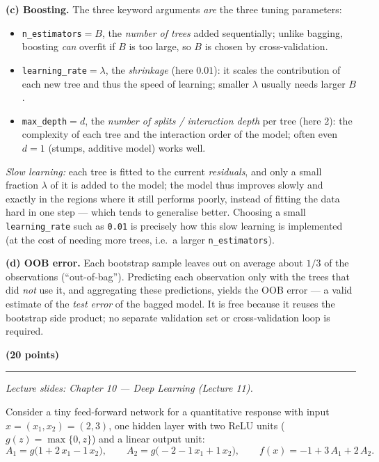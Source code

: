 \documentclass[11pt,a4paper]{article}
\newcommand{\problem}[2]{\par\vspace{7mm}\noindent{\large\textbf{Problem #1}}%
  \hfill{\large\textbf{(#2 points)}}\par\nopagebreak\vspace{0.6mm}%
  \noindent\rule{\textwidth}{0.6pt}\par\nopagebreak\vspace{2.5mm}}
\begin{document}
\begin{solutionbox}
\medskip
\textbf{(c) Boosting.}
The three keyword arguments \emph{are} the three tuning parameters:
\begin{itemize}[nosep,leftmargin=5mm]
  \item \texttt{n\_estimators}${}=B$, the \emph{number of trees} added sequentially; unlike
    bagging, boosting \emph{can} overfit if $B$ is too large, so $B$ is chosen by
    cross-validation.
  \item \texttt{learning\_rate}${}=\lambda$, the \emph{shrinkage} (here $0.01$): it scales the
    contribution of each new tree and thus the speed of learning; smaller $\lambda$ usually
    needs larger $B$.
  \item \texttt{max\_depth}${}=d$, the \emph{number of splits / interaction depth} per tree
    (here $2$): the complexity of each tree and the interaction order of the model; often even
    $d=1$ (stumps, additive model) works well.
\end{itemize}
\emph{Slow learning:} each tree is fitted to the current \emph{residuals}, and only a small
fraction $\lambda$ of it is added to the model; the model thus improves slowly and exactly in
the regions where it still performs poorly, instead of fitting the data hard in one step ---
which tends to generalise better. Choosing a small \texttt{learning\_rate} such as
\texttt{0.01} is precisely how this slow learning is implemented (at the cost of needing more
trees, i.e.\ a larger \texttt{n\_estimators}).

\medskip
\textbf{(d) OOB error.}
Each bootstrap sample leaves out on average about $1/3$ of the observations
(``out-of-bag''). Predicting each observation only with the trees that did \emph{not} use it,
and aggregating these predictions, yields the OOB error --- a valid estimate of the
\emph{test error} of the bagged model. It is free because it reuses the bootstrap side
product; no separate validation set or cross-validation loop is required.
\end{solutionbox}
\fi

\problem{5: Neural networks by hand}{20}
{\small\itshape Lecture slides: Chapter 10 --- Deep Learning (Lecture 11).}\par\vspace{1mm}

Consider a tiny feed-forward network for a quantitative response with input
$x=(x_1,x_2)=(2,3)$, one hidden layer with two ReLU units
($g(z)=\max\{0,z\}$) and a linear output unit:
\[
  A_1=g\bigl(1+2\,x_1-1\,x_2\bigr),\qquad
  A_2=g\bigl(-2-1\,x_1+1\,x_2\bigr),\qquad
  f(x)=-1+3\,A_1+2\,A_2 .
\]
\end{document}
